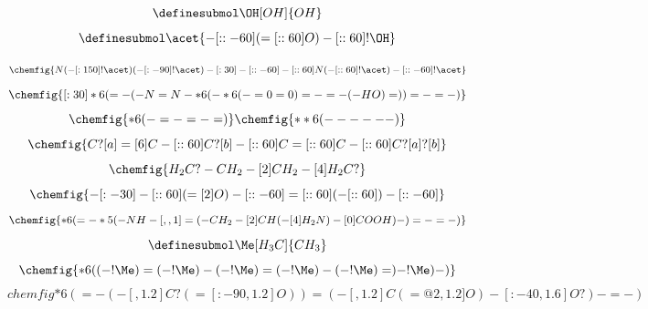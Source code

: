 \documentclass{jsarticle}
\begin{document}
\setatomsep{2em}
 $$ \definesubmol\OH[OH]{OH} $$
 $$ \definesubmol\acet{-[::-60](=[::60]O)-[::60]!\OH} $$

 $$ \chemfig{N(-[:150]!\acet)(-[:-90]!\acet)-[:30]-[::-60]-[::60]N(-[::60]!\acet)-[::-60]!\acet} $$
 $$ \chemfig{[:30]*6(=-(-N=N-*6(-*6(-=0=0)=-=-(-HO)=))=-=-)}$$
 $$ \chemfig{*6(-=-=-=)} \chemfig{**6(------)} $$
 $$ \chemfig{C?[a]=[6]C-[::60]C?[b]-[::60]C=[::60]C-[::60]C?[a]?[b]} $$
 $$ \chemfig{H_2C? - CH_2 -[2] CH_2 -[4] H_2C?} $$
 $$ \chemfig{-[:-30]-[::60](=[2]O)-[::-60]=[::60](-[::60])-[::-60]} $$
 $$ \chemfig{*6(=-*5(-NH-[,,1]=(- CH_2 -[2] CH (-[4] H_2N) -[0] COOH)-)=-=-)} $$
 $$ \definesubmol\Me[H_3C]{CH_3} $$
 $$ \chemfig{*6((-!\Me)=(-!\Me)-(-!\Me)=(-!\Me)-(-!\Me)=)-!\Me)-)} $$
 $$ chemfig{*6(=-(-[,1.2]C?(=[:-90,1.2]O))=(-[,1.2]C(=@2,1.2]O)-[:-40,1.6]O?)-=-)} $$
\end{document}
